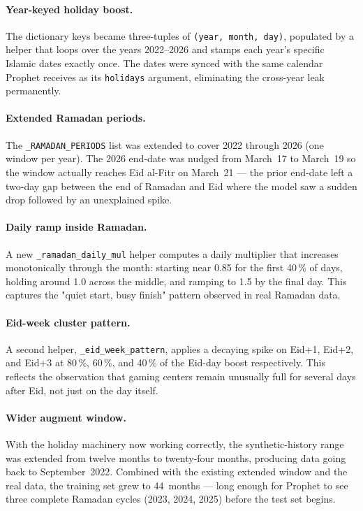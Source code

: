 \paragraph{Year-keyed holiday boost.} The dictionary keys became three-tuples
of \texttt{(year, month, day)}, populated by a helper that loops over the years
2022--2026 and stamps each year's specific Islamic dates exactly once. The dates
were synced with the same calendar Prophet receives as its \texttt{holidays}
argument, eliminating the cross-year leak permanently.

\paragraph{Extended Ramadan periods.} The \texttt{\_RAMADAN\_PERIODS} list was
extended to cover 2022 through 2026 (one window per year). The 2026 end-date
was nudged from March~17 to March~19 so the window actually reaches Eid
al-Fitr on March~21 --- the prior end-date left a two-day gap between the end
of Ramadan and Eid where the model saw a sudden drop followed by an unexplained
spike.

\paragraph{Daily ramp inside Ramadan.} A new \texttt{\_ramadan\_daily\_mul}
helper computes a daily multiplier that increases monotonically through the
month: starting near 0.85 for the first 40\,\% of days, holding around 1.0
across the middle, and ramping to 1.5 by the final day. This captures the
"quiet start, busy finish" pattern observed in real Ramadan data.

\paragraph{Eid-week cluster pattern.} A second helper,
\texttt{\_eid\_week\_pattern}, applies a decaying spike on Eid+1, Eid+2, and
Eid+3 at 80\,\%, 60\,\%, and 40\,\% of the Eid-day boost respectively. This
reflects the observation that gaming centers remain unusually full for several
days after Eid, not just on the day itself.

\paragraph{Wider augment window.} With the holiday machinery now working
correctly, the synthetic-history range was extended from twelve months to
twenty-four months, producing data going back to September~2022. Combined
with the existing extended window and the real data, the training set grew
to 44~months --- long enough for Prophet to see three complete Ramadan cycles
(2023, 2024, 2025) before the test set begins.

